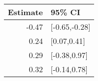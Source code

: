 \begin{tabular}{rl}
  \hline
Estimate & 95\% CI \\ 
  \hline
-0.47 & [-0.65,-0.28] \\ 
  0.24 & [0.07,0.41] \\ 
  0.29 & [-0.38,0.97] \\ 
  0.32 & [-0.14,0.78] \\ 
   \hline
\end{tabular}

